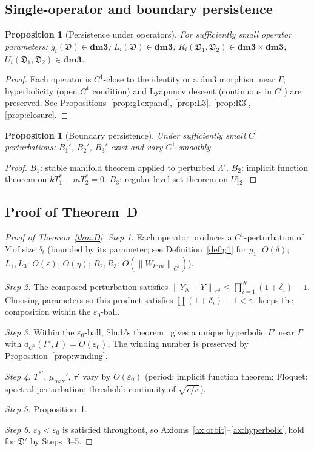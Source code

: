 \documentclass[12pt, oneside]{book}
\theoremstyle{plain}
\newtheorem{proposition}[theorem]{Proposition}
\theoremstyle{definition}
\theoremstyle{remark}
\newcommand{\dm}{\mathfrak{D}}
\newcommand{\dmcat}{\mathbf{dm3}}
\newcommand{\Orb}{\Gamma}
\newcommand{\eps}{\varepsilon}
\newcommand{\norm}[1]{\left\|#1\right\|}
\begin{document}
\subsection{Single-operator and boundary persistence}

\begin{proposition}[Persistence under operators]\label{prop:persist}
For sufficiently small operator parameters:
$g_i(\dm)\in\dmcat$;
$L_i(\dm)\in\dmcat$;
$R_i(\dm_1,\dm_2)\in\dmcat\times\dmcat$;
$U_i(\dm_1,\dm_2)\in\dmcat$.
\end{proposition}
\begin{proof}
Each operator is $C^1$-close to the identity or a dm3 morphism
near $\Orb$; hyperbolicity (open $C^1$ condition) and Lyapunov
descent (continuous in $C^1$) are preserved. See
Propositions~\ref{prop:g1expand}, \ref{prop:L3}, \ref{prop:R3},
\ref{prop:closure}.
\end{proof}

\begin{proposition}[Boundary persistence]\label{prop:bdy-persist}
Under sufficiently small $C^1$ perturbations: $B_1'$, $B_2'$, $B_3'$
exist and vary $C^1$-smoothly.
\end{proposition}
\begin{proof}
$B_1$: stable manifold theorem applied to perturbed $\Lambda'$.
$B_2$: implicit function theorem on $kT_1^*-mT_2^*=0$.
$B_3$: regular level set theorem on $U_{12}^\eps$.
\end{proof}

\subsection{Proof of Theorem~D}

\begin{proof}[Proof of Theorem~\ref{thm:D}]
\emph{Step 1.} Each operator produces a $C^1$-perturbation of $Y$
of size $\delta_i$ (bounded by its parameter; see
Definition~\ref{def:g1} for $g_1$: $O(\delta)$; $L_1,L_3$: $O(\eps)$,
$O(\eta)$; $R_2,R_3$: $O(\norm{W_{k:m}}_{C^1})$).

\emph{Step 2.} The composed perturbation satisfies
$\norm{Y_N-Y}_{C^1}\le\prod_{i=1}^N(1+\delta_i)-1$.
Choosing parameters so this product satisfies
$\prod(1+\delta_i)-1<\varepsilon_0$ keeps the composition within
the $\varepsilon_0$-ball.

\emph{Step 3.} Within the $\varepsilon_0$-ball, Shub's theorem~\cite{Shub}
gives a unique hyperbolic $\Orb'$ near $\Orb$ with
$d_{C^1}(\Orb',\Orb)=O(\varepsilon_0)$. The winding number is preserved
by Proposition~\ref{prop:winding}.

\emph{Step 4.} $T^{*\prime}$, $\mu_{\max}'$, $\tau'$ vary by
$O(\varepsilon_0)$ (period: implicit function theorem; Floquet:
spectral perturbation; threshold: continuity of $\sqrt{c/\kappa}$).

\emph{Step 5.} Proposition~\ref{prop:bdy-persist}.

\emph{Step 6.} $\varepsilon_0<\varepsilon_0$ is satisfied throughout,
so Axioms~\ref{ax:orbit}--\ref{ax:hyperbolic} hold for $\dm'$
by Steps~3--5.
\end{proof}
\end{document}
